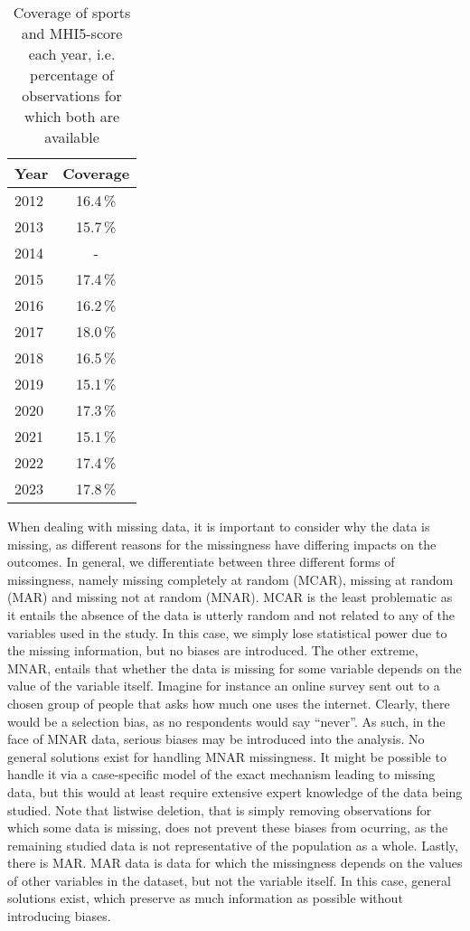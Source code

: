 \begin{table}[htbp]
    \centering
    \caption{Coverage of sports and MHI5-score each year, i.e. percentage of observations for which both are available}
    \label{tab:data:coverage}
    \begin{tabular}{lc}
        \toprule
        Year & Coverage \\
        \hline
        2012 & 16.4\,\% \\
        2013 & 15.7\,\% \\
        2014 & -      \\
        2015 & 17.4\,\% \\
        2016 & 16.2\,\% \\
        2017 & 18.0\,\% \\
        2018 & 16.5\,\% \\
        2019 & 15.1\,\% \\
        2020 & 17.3\,\% \\
        2021 & 15.1\,\% \\
        2022 & 17.4\,\% \\
        2023 & 17.8\,\% \\
        \bottomrule
    \end{tabular}
\end{table}

When dealing with missing data, it is important to consider why the data is missing, as different reasons for the missingness
have differing impacts on the outcomes. In general, we differentiate between three different forms of missingness,
namely missing completely at random (MCAR), missing at random (MAR) and missing not at random (MNAR).
MCAR is the least problematic as it entails the absence of the data is utterly random and not related to any of the
variables used in the study. In this case, we simply lose statistical power due to the missing information, but
no biases are introduced.
The other extreme, MNAR, entails that whether the data is missing for some variable depends on the value of the variable itself.
Imagine for instance an online survey sent out to a chosen group of people that asks how much one uses the internet.
Clearly, there would be a selection bias, as no respondents would say ``never''.
As such, in the face of MNAR data, serious biases may be introduced into the analysis. No general solutions exist for handling
MNAR missingness. It might be possible to handle it via a case-specific model of the exact mechanism leading to missing data,
but this would at least require extensive expert knowledge of the data being studied. Note that listwise deletion,
that is simply removing observations for which some data is missing, does not prevent these biases from ocurring,
as the remaining studied data is not representative of the population as a whole.
Lastly, there is MAR. MAR data is data for which the missingness depends on the values of other variables in the dataset,
but not the variable itself. In this case, general solutions exist, which preserve as much information as possible
without introducing biases.

